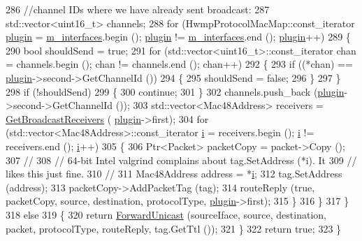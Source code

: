 \begin{DoxyCode}
286       \textcolor{comment}{//channel IDs where we have already sent broadcast:}
287       std::vector<uint16\_t> channels;
288       \textcolor{keywordflow}{for} (HwmpProtocolMacMap::const\_iterator \hyperlink{visualizer-ideas_8txt_a82212ee380150b652f4dad598413d06f}{plugin} = \hyperlink{classns3_1_1dot11s_1_1HwmpProtocol_ae2cee085d1d2b9d32b509b710c0b4511}{m\_interfaces}.begin (); 
      \hyperlink{visualizer-ideas_8txt_a82212ee380150b652f4dad598413d06f}{plugin} != \hyperlink{classns3_1_1dot11s_1_1HwmpProtocol_ae2cee085d1d2b9d32b509b710c0b4511}{m\_interfaces}.end (); \hyperlink{visualizer-ideas_8txt_a82212ee380150b652f4dad598413d06f}{plugin}++)
289         \{
290           \textcolor{keywordtype}{bool} shouldSend = \textcolor{keyword}{true};
291           \textcolor{keywordflow}{for} (std::vector<uint16\_t>::const\_iterator chan = channels.begin (); chan != channels.end (); 
      chan++)
292             \{
293               \textcolor{keywordflow}{if} ((*chan) == \hyperlink{visualizer-ideas_8txt_a82212ee380150b652f4dad598413d06f}{plugin}->second->GetChannelId ())
294                 \{
295                   shouldSend = \textcolor{keyword}{false};
296                 \}
297             \}
298           \textcolor{keywordflow}{if} (!shouldSend)
299             \{
300               \textcolor{keywordflow}{continue};
301             \}
302           channels.push\_back (\hyperlink{visualizer-ideas_8txt_a82212ee380150b652f4dad598413d06f}{plugin}->second->GetChannelId ());
303           std::vector<Mac48Address> receivers = \hyperlink{classns3_1_1dot11s_1_1HwmpProtocol_acaab4681cd6b7901ffd5a5f88dc113e2}{GetBroadcastReceivers} (
      \hyperlink{visualizer-ideas_8txt_a82212ee380150b652f4dad598413d06f}{plugin}->first);
304           \textcolor{keywordflow}{for} (std::vector<Mac48Address>::const\_iterator \hyperlink{bernuolliDistribution_8m_a6f6ccfcf58b31cb6412107d9d5281426}{i} = receivers.begin (); 
      \hyperlink{bernuolliDistribution_8m_a6f6ccfcf58b31cb6412107d9d5281426}{i} != receivers.end (); \hyperlink{bernuolliDistribution_8m_a6f6ccfcf58b31cb6412107d9d5281426}{i}++)
305             \{
306               Ptr<Packet> packetCopy = packet->Copy ();
307               \textcolor{comment}{//}
308               \textcolor{comment}{// 64-bit Intel valgrind complains about tag.SetAddress (*i).  It}
309               \textcolor{comment}{// likes this just fine.}
310               \textcolor{comment}{//}
311               Mac48Address address = *\hyperlink{bernuolliDistribution_8m_a6f6ccfcf58b31cb6412107d9d5281426}{i};
312               tag.SetAddress (address);
313               packetCopy->AddPacketTag (tag);
314               routeReply (\textcolor{keyword}{true}, packetCopy, source, destination, protocolType, 
      \hyperlink{visualizer-ideas_8txt_a82212ee380150b652f4dad598413d06f}{plugin}->first);
315             \}
316         \}
317     \}
318   \textcolor{keywordflow}{else}
319     \{
320       \textcolor{keywordflow}{return} \hyperlink{classns3_1_1dot11s_1_1HwmpProtocol_ad2284f9a590203f8c407e3ab03560edf}{ForwardUnicast} (sourceIface, source, destination, packet, protocolType, 
      routeReply, tag.GetTtl ());
321     \}
322   \textcolor{keywordflow}{return} \textcolor{keyword}{true};
323 \}
\end{DoxyCode}



